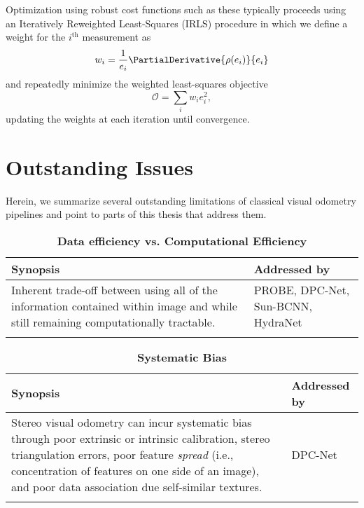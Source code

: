 Optimization using robust cost functions such as these typically proceeds using an Iteratively Reweighted Least-Squares (IRLS) procedure in which we define a weight for the $i^{\text{th}}$ measurement as
\begin{equation}
    w_i = \frac{1}{e_i}\PartialDerivative{\rho(e_i)}{e_i}
\end{equation}
and repeatedly minimize the weighted least-squares objective
\begin{equation}
    \mathcal{O} = \sum_i w_i e_i^2,
\end{equation}
updating the weights at each iteration until convergence.

\section{Outstanding Issues}
Herein, we summarize several outstanding limitations of classical visual odometry pipelines and point to parts of this thesis that address them.

\begin{table}[h!]
	\caption{\textbf{Data efficiency vs. Computational Efficiency}}	\begin{threeparttable}
	\begin{tabular}{m{}m{}}
		\toprule
		\textbf{Synopsis} & \textbf{Addressed by} \\ \midrule  
		Inherent trade-off between using all of the information contained within image and while still remaining computationally tractable. & PROBE, DPC-Net, Sun-BCNN, HydraNet \\
		& \\
		\bottomrule
	\end{tabular}
\end{threeparttable}
\end{table}


\begin{table}[h!]
	\caption{\textbf{Systematic Bias}}
	\begin{threeparttable}
	\begin{tabular}{m{}m{}}
		\toprule
		\textbf{Synopsis} & \textbf{Addressed by} \\ \midrule  
		Stereo visual odometry can incur systematic bias through poor extrinsic or intrinsic calibration, stereo triangulation errors, poor feature \textit{spread} (i.e., concentration of features on one side of an image), and poor data association due self-similar textures. &  DPC-Net \\
		& \\
		\bottomrule
	\end{tabular}
\end{threeparttable}
\end{table}


